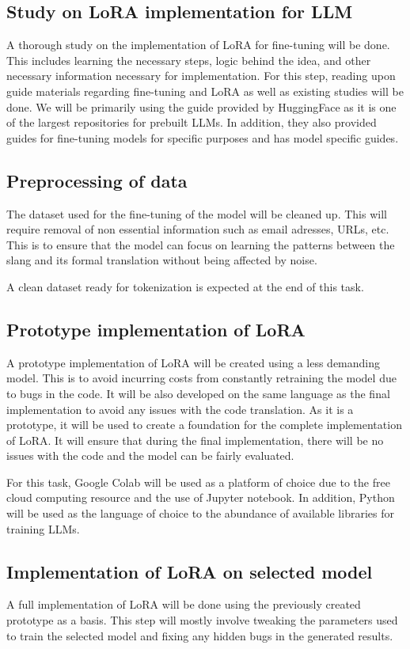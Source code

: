 \subsection{Study on LoRA implementation for LLM}
A thorough study on the implementation of LoRA for fine-tuning will be done.
This includes learning the necessary steps, logic behind the idea, and other necessary information necessary for implementation.
For this step, reading upon guide materials regarding fine-tuning and LoRA as well as existing studies will be done.
We will be primarily using the guide provided by HuggingFace as it is one of the largest repositories for prebuilt LLMs.
In addition, they also provided guides for fine-tuning models for specific purposes and has model specific guides.

\subsection{Preprocessing of data} 
The dataset used for the fine-tuning of the model will be cleaned up.
This will require removal of non essential information such as email adresses, URLs, etc.
This is to ensure that the model can focus on learning the patterns between the slang and its formal translation without being affected by noise.

A clean dataset ready for tokenization is expected at the end of this task.

\subsection{Prototype implementation of LoRA}
A prototype implementation of LoRA will be created using a less demanding model.
This is to avoid incurring costs from constantly retraining the model due to bugs in the code.
It will be also developed on the same language as the final implementation to avoid any issues with the code translation.
As it is a prototype, it will be used to create a foundation for the complete implementation of LoRA.
It will ensure that during the final implementation, there will be no issues with the code and the model can be fairly evaluated.

For this task, Google Colab will be used as a platform of choice due to the free cloud computing resource and the use of Jupyter notebook.
In addition, Python will be used as the language of choice to the abundance of available libraries for training LLMs.

\subsection{Implementation of LoRA on selected model}
A full implementation of LoRA will be done using the previously created prototype as a basis.
This step will mostly involve tweaking the parameters used to train the selected model and fixing any hidden bugs in the generated results.

